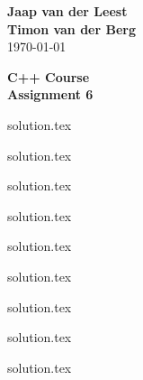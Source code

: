 \documentclass{article}[9pt]
\begin{document}
\begin{flushright}
	\textbf{Jaap van der Leest\\ Timon van der Berg \\ }
\today
\end{flushright}

\begin{center}
\textbf{C++ Course \\
Assignment 6} \\
\end{center}

\tableofcontents

{solution.tex}


{solution.tex}


{solution.tex}


{solution.tex}


{solution.tex}


{solution.tex}


{solution.tex}


{solution.tex}


{solution.tex}
\end{document}
